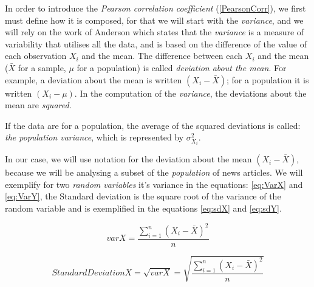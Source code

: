 In order to introduce the \emph{Pearson correlation coefficient} (\ref{PearsonCorr}), we first must define how it is composed, for that we will start with the \emph{variance}, and we will rely on the work of Anderson \cite{AN2011} which states that the \emph{variance} is a measure of variability that utilises all the data, and is based on the difference of the value of each observation \begin{math}X_{i}\end{math} and the mean. The difference between each \begin{math}X_{i}\end{math} and the mean (\begin{math}\bar{X}\end{math} for a sample, \begin{math}\mu\end{math} for a population) is called \emph{deviation about the mean}. For example, a deviation about the mean is written \begin{math}(X_{i} - \bar{X})\end{math}; for a population it is written \begin{math}(X_{i} - \mu)\end{math}. In the computation of the \emph{variance}, the deviations about the mean are \emph{squared}. 

If the data are for a population, the average of the squared deviations is called: \emph{the population variance}, which is represented by \begin{math}\sigma ^2 _{X_i}\end{math}.

In our case, we will use notation for the deviation about the mean \begin{math}(X_{i} - \bar{X})\end{math}, because we will be analysing a subset of the \emph{population} of news articles. We will exemplify for two \emph{random variables} it's variance in the equations: \ref{eq:VarX} and \ref{eq:VarY}, the Standard deviation is the square root of the variance of the random variable and is exemplified in the equations \ref{eq:sdX} and \ref{eq:sdY}.


\begin{equation} \label{eq:VarX}
	var X = \frac{\sum ^n _{i=1}{(X_i - \bar{X})}^2}{n}
\end{equation}

\begin{equation} \label{eq:sdX}
	Standard Deviation X = \sqrt{var X} = \sqrt{\frac{\sum ^n _{i=1}{(X_i - \bar{X})}^2}{n}}
\end{equation}

